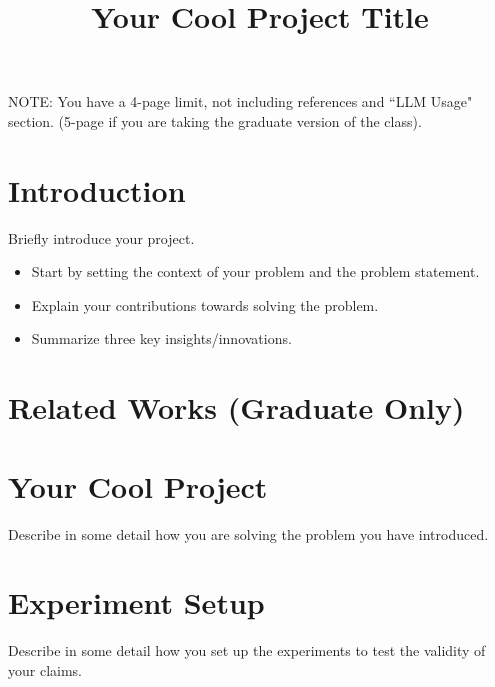 \documentclass[conference]{IEEEtran}
\begin{document}
\title{Your Cool Project Title}

\author{
\and
{}
}

\maketitle

NOTE: You have a 4-page limit, not including references and ``LLM Usage" section. (5-page if you are taking the graduate version of the class).

\section{Introduction}
Briefly introduce your project.
\begin{itemize}
    \item Start by setting the context of your problem and the problem statement.
    \item Explain your contributions towards solving the problem.
    \item Summarize three key insights/innovations.
\end{itemize}


\section{Related Works (Graduate Only)}


\section{Your Cool Project}
Describe in some detail how you are solving the problem you have introduced.


\section{Experiment Setup}
Describe in some detail how you set up the experiments to test the validity of your claims.
\end{document}
